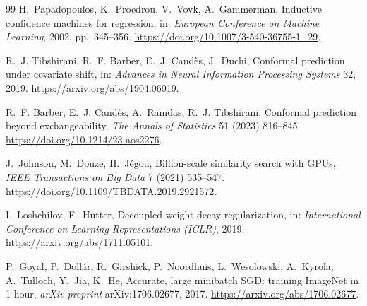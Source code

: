\documentclass[final,5p,twocolumn,10pt]{elsarticle}
\begin{document}
\begin{thebibliography}{99}
H.~Papadopoulos, K.~Proedrou, V.~Vovk, A.~Gammerman,
\newblock Inductive confidence machines for regression,
\newblock in: \textit{European Conference on Machine Learning}, 2002, pp.~345--356.
\newblock \url{https://doi.org/10.1007/3-540-36755-1_29}.

R.~J. Tibshirani, R.~F. Barber, E.~J. Cand\`{e}s, J.~Duchi,
\newblock Conformal prediction under covariate shift,
\newblock in: \textit{Advances in Neural Information Processing Systems} 32, 2019.
\newblock \url{https://arxiv.org/abs/1904.06019}.

R.~F. Barber, E.~J. Cand\`{e}s, A.~Ramdas, R.~J. Tibshirani,
\newblock Conformal prediction beyond exchangeability,
\newblock \textit{The Annals of Statistics} 51 (2023) 816--845.
\newblock \url{https://doi.org/10.1214/23-aos2276}.

J.~Johnson, M.~Douze, H.~J\'{e}gou,
\newblock Billion-scale similarity search with {GPUs},
\newblock \textit{IEEE Transactions on Big Data} 7 (2021) 535--547.
\newblock \url{https://doi.org/10.1109/TBDATA.2019.2921572}.

I.~Loshchilov, F.~Hutter,
\newblock Decoupled weight decay regularization,
\newblock in: \textit{International Conference on Learning Representations (ICLR)}, 2019.
\newblock \url{https://arxiv.org/abs/1711.05101}.

P.~Goyal, P.~Doll\'{a}r, R.~Girshick, P.~Noordhuis, L.~Wesolowski, A.~Kyrola, A.~Tulloch, Y.~Jia, K.~He,
\newblock Accurate, large minibatch {SGD}: training {ImageNet} in 1 hour,
\newblock \textit{arXiv preprint} arXiv:1706.02677, 2017.
\newblock \url{https://arxiv.org/abs/1706.02677}.

\end{thebibliography}
\end{document}
